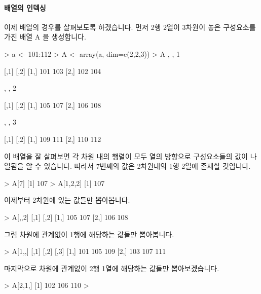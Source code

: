 \documentclass[tutorial.tex]{subfiles}
\begin{document}
\paragraph{배열의 인덱싱} 이제 배열의 경우를 살펴보도록 하겠습니다. 
먼저 2행 2열이 3차원이 놓은 구성요소를 가진 배열 A 을 생성합니다.

\begin{Schunk}
\begin{Soutput}
> a <- 101:112
> A <- array(a, dim=c(2,2,3))
> A
, , 1

     [,1] [,2]
[1,]  101  103
[2,]  102  104

, , 2

     [,1] [,2]
[1,]  105  107
[2,]  106  108

, , 3

     [,1] [,2]
[1,]  109  111
[2,]  110  112

\end{Soutput}
\end{Schunk}

이 배열을 잘 살펴보면 각 차원 내의 행렬이 모두 열의 방향으로 구성요소들의 값이 나열됨을 알 수 있습니다. 
따라서 7번째의 값은 2차원내의 1행 2열에 존재할 것입니다. 

\begin{Schunk}
\begin{Soutput}
> A[7]
[1] 107
> A[1,2,2]
[1] 107
\end{Soutput}
\end{Schunk}


이제부터 2차원에 있는 값들만 뽑아봅니다. 

\begin{Schunk}
\begin{Soutput}
> A[,,2]
     [,1] [,2]
[1,]  105  107
[2,]  106  108
\end{Soutput}
\end{Schunk}


그럼 차원에 관계없이 1행에 해당하는 값들만 뽑아봅니다.
\begin{Schunk}
\begin{Soutput}
> A[1,,]
     [,1] [,2] [,3]
[1,]  101  105  109
[2,]  103  107  111
\end{Soutput}
\end{Schunk}


마지막으로 차원에 관계없이 2행 1열에 해당하는 값들만 뽑아보겠습니다. 

\begin{Schunk}
\begin{Soutput}
> A[2,1,]
[1] 102 106 110
> 
\end{Soutput}
\end{Schunk}
\end{document}
